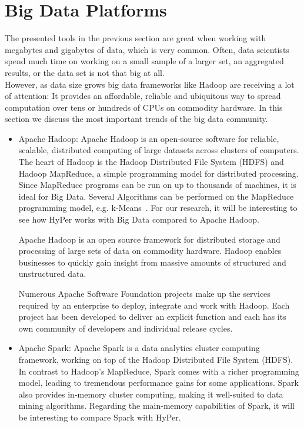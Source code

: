\section{Big Data Platforms}
The presented tools in the previous section are great when working with megabytes and gigabytes of data, which is very common. Often, data scientists spend much time on working on a small sample of a larger set, an aggregated results, or the data set is not that big at all.
\\
However, as data size grows big data frameworks like Hadoop are receiving a lot of attention: It provides an affordable, reliable and ubiquitous way to spread computation over tens or hundreds of CPUs on commodity hardware.
In this section we discuss the most important trends of the big data community.

\begin{itemize}
\item Apache Hadoop: Apache Hadoop is an open-source software for reliable, scalable, distributed computing of large datasets across clusters of computers. The heart of Hadoop is the Hadoop Distributed File System (HDFS) and Hadoop MapReduce, a simple programming model for distributed processing. Since MapReduce programs can be run on up to thousands of machines, it is ideal for Big Data. Several Algorithms can be performed on the MapReduce programming model, e.g. k-Means~\parencite{parallelkmeans}. For our research, it will be interesting to see how HyPer works with Big Data compared to Apache Hadoop.

Apache Hadoop is an open source framework for distributed storage and processing of large sets of data on commodity hardware. Hadoop enables businesses to quickly gain insight from massive amounts of structured and unstructured data.

Numerous Apache Software Foundation projects make up the services required by an enterprise to deploy, integrate and work with Hadoop.  Each project has been developed to deliver an explicit function and each has its own community of developers and individual release cycles.

\item Apache Spark: Apache Spark is a data analytics cluster computing framework, working on top of the Hadoop Distributed File System (HDFS). In contrast to Hadoop’s MapReduce, Spark comes with a richer programming model, leading to tremendous performance gains for some applications. Spark also provides in-memory cluster computing, making it well-suited to data mining algorithms. Regarding the main-memory capabilities of Spark, it will be interesting to compare Spark with HyPer.


\end{itemize}
